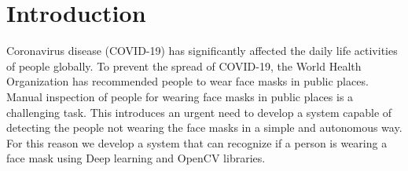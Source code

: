 \section{Introduction} 
Coronavirus disease (COVID-19) has significantly affected the daily life activities of people globally.
To prevent the spread of COVID-19, the World Health Organization has recommended people to wear face masks in public places.
Manual inspection of people for wearing face masks in public places is a challenging task.
This introduces an urgent need to develop a system capable of detecting the people not wearing the face masks in a simple and autonomous way. For this reason we develop a system that can recognize if a person is wearing a face mask using Deep learning and OpenCV libraries.